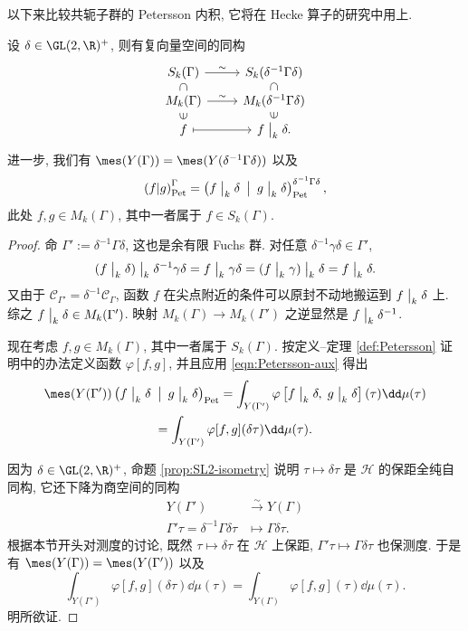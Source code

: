 以下来比较共轭子群的 Petersson 内积, 它将在 Hecke 算子的研究中用上.
\begin{lemma}\label{prop:transport-conjugation}
	设 $\delta \in \GL(2,\R)^+$, 则有复向量空间的同构
	\[\begin{tikzcd}[row sep=tiny]
		S_k(\Gamma) \arrow[r, "\sim"] \arrow[phantom, d, "\subset" sloped] & S_k(\delta^{-1} \Gamma \delta) \arrow[phantom, d, "\subset" sloped] \\
		M_k(\Gamma) \arrow[r, "\sim"] & M_k(\delta^{-1} \Gamma \delta) \\
		f \arrow[mapsto, r] \arrow[phantom, u, "\in" sloped] & f \modact{k} \delta \arrow[phantom, u, "\in" sloped].
	\end{tikzcd}\]
	进一步, 我们有 $\mes(Y(\Gamma)) = \mes(Y(\delta^{-1}\Gamma\delta))$ 以及
	\[ \left( f \middle| g \right)_{\mathrm{Pet}}^\Gamma = \left( f \;\big|_{k} \; \delta\enspace \middle| \enspace g \;\big|_{k} \; \delta \right)_{\mathrm{Pet}}^{\delta^{-1}\Gamma\delta}, \]
	此处 $f,g \in M_k(\Gamma)$, 其中一者属于 $f \in S_k(\Gamma)$.
\end{lemma}
\begin{proof}
	命 $\Gamma' := \delta^{-1}\Gamma\delta$, 这也是余有限 Fuchs 群. 对任意 $\delta^{-1}\gamma \delta \in \Gamma'$,
	\[ (f \;\big|_{k} \; \delta) \;\big|_{k} \; \delta^{-1}\gamma\delta = f \;\big|_{k} \; \gamma\delta = (f \;\big|_{k} \; \gamma) \;\big|_{k} \; \delta = f \;\big|_{k} \; \delta. \]
	又由于 $\mathcal{C}_{\Gamma'} = \delta^{-1} \mathcal{C}_\Gamma$, 函数 $f$ 在尖点附近的条件可以原封不动地搬运到 $f \;\big|_{k} \; \delta$ 上. 综之 $f \;\big|_{k} \; \delta \in M_k(\Gamma')$. 映射 $M_k(\Gamma) \to M_k(\Gamma')$ 之逆显然是 $f \;\big|_{k} \; \delta^{-1}$.
	
	现在考虑 $f, g \in M_k(\Gamma)$, 其中一者属于 $S_k(\Gamma)$. 按定义--定理 \ref{def:Petersson} 证明中的办法定义函数 $\varphi[f, g]$, 并且应用 \eqref{eqn:Petersson-aux} 得出
	\begin{multline*}
		\mes(Y(\Gamma')) \innerPet{ f \modact{k} \delta\enspace}{\enspace g \modact{k} \delta} = \int_{Y(\Gamma')} \varphi\left[ f \modact{k} \delta,\; g \modact{k} \delta \right](\tau) \dd\mu(\tau) \\
		= \int_{Y(\Gamma')} \varphi[f,g](\delta\tau) \dd\mu(\tau).
	\end{multline*}
	
	因为 $\delta \in \GL(2,\R)^+$, 命题 \ref{prop:SL2-isometry} 说明 $\tau \mapsto \delta\tau$ 是 $\mathcal{H}$ 的保距全纯自同构, 它还下降为商空间的同构
	\begin{align*}
		Y(\Gamma') & \stackrel{\sim}{\longrightarrow} Y(\Gamma) \\
		\Gamma'\tau = \delta^{-1}\Gamma\delta\tau & \longmapsto \Gamma\delta\tau.
	\end{align*}
	根据本节开头对测度的讨论, 既然 $\tau \mapsto \delta\tau$ 在 $\mathcal{H}$ 上保距, $\Gamma'\tau \mapsto \Gamma\delta\tau$ 也保测度. 于是有 $\mes(Y(\Gamma)) = \mes(Y(\Gamma'))$ 以及
	\[ \int_{Y(\Gamma')} \varphi[f,g](\delta\tau) \dd\mu(\tau) = \int_{Y(\Gamma)} \varphi[f,g](\tau) \dd\mu(\tau). \]
	明所欲证.
\end{proof}


